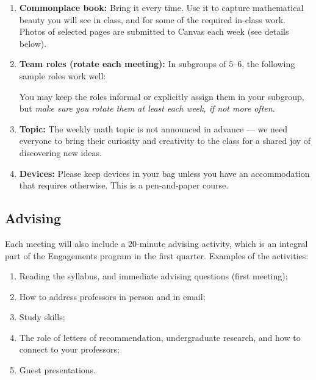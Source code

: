 \documentclass[oneside,11pt]{amsart}
\begin{document}
\begin{enumerate}[$\bullet$]
	\item \textbf{Commonplace book:} Bring it every time.
	Use it to capture mathematical beauty you will see in class, and for
	some of the required in-class work.
	Photos of selected pages
	are submitted to Canvas each week (see details below).

  \item \textbf{Team roles (rotate each meeting):} In subgroups of $5$--$6$,
		the following sample roles work well:
		You may keep the roles informal or explicitly assign them in your
		subgroup, but \emph{make sure you rotate them at least each week,
		if not more often}.

	\item \textbf{Topic:}
		The weekly math topic is not announced in advance --- we
		need everyone to bring their curiosity and creativity to
		the class for a shared joy of discovering new ideas.

  \item \textbf{Devices:} Please keep devices in your bag
		unless you have an accommodation that requires otherwise.
		This is a pen-and-paper course.
\end{enumerate}



\subsection{Advising}
Each meeting will also include a 20-minute advising activity, which is an integral part of the Engagements program in the first quarter.
Examples of the activities:
\begin{enumerate}[$\bullet$]
\item Reading the syllabus, and immediate advising questions (first meeting);
\item How to address professors in person and in email;
\item Study skills;
\item The role of letters of recommendation, undergraduate research, and how to connect to your professors;
\item Guest presentations.
\end{enumerate}
\end{document}
